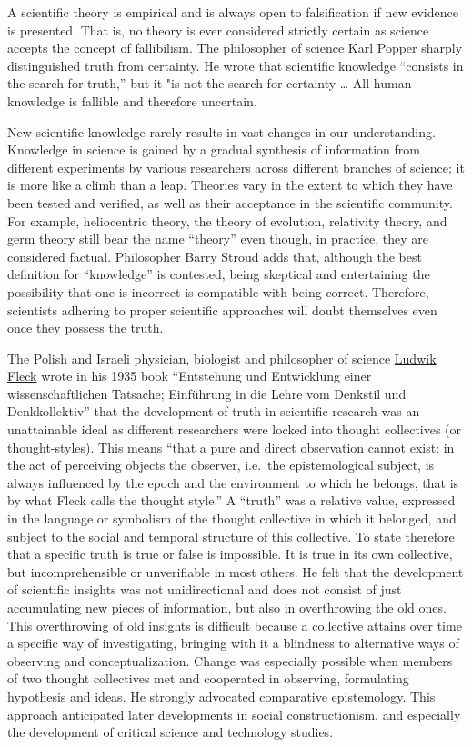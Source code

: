 A scientific theory is empirical and is always open to falsification if new evidence is presented. That is, no theory is ever considered strictly certain as science accepts the concept of fallibilism. The philosopher of science Karl Popper sharply distinguished truth from certainty. He wrote that scientific knowledge ``consists in the search for truth,'' but it "is not the search for certainty \ldots{} All human knowledge is fallible and therefore uncertain.

New scientific knowledge rarely results in vast changes in our understanding. Knowledge in science is gained by a gradual synthesis of information from different experiments by various researchers across different branches of science; it is more like a climb than a leap. Theories vary in the extent to which they have been tested and verified, as well as their acceptance in the scientific community. For example, heliocentric theory, the theory of evolution, relativity theory, and germ theory still bear the name ``theory'' even though, in practice, they are considered factual. Philosopher Barry Stroud adds that, although the best definition for ``knowledge'' is contested, being skeptical and entertaining the possibility that one is incorrect is compatible with being correct. Therefore, scientists adhering to proper scientific approaches will doubt themselves even once they possess the truth.

The Polish and Israeli physician, biologist and philosopher of science \href{https://en.wikipedia.org/wiki/Ludwik_Fleck}{Ludwik Fleck} wrote in his 1935 book ``Entstehung und Entwicklung einer wissenschaftlichen Tatsache; Einführung in die Lehre vom Denkstil und Denkkollektiv'' that the development of truth in scientific research was an unattainable ideal as different researchers were locked into thought collectives (or thought-styles). This means ``that a pure and direct observation cannot exist: in the act of perceiving objects the observer, i.e.~the epistemological subject, is always influenced by the epoch and the environment to which he belongs, that is by what Fleck calls the thought style.'' A ``truth'' was a relative value, expressed in the language or symbolism of the thought collective in which it belonged, and subject to the social and temporal structure of this collective. To state therefore that a specific truth is true or false is impossible. It is true in its own collective, but incomprehensible or unverifiable in most others. He felt that the development of scientific insights was not unidirectional and does not consist of just accumulating new pieces of information, but also in overthrowing the old ones. This overthrowing of old insights is difficult because a collective attains over time a specific way of investigating, bringing with it a blindness to alternative ways of observing and conceptualization. Change was especially possible when members of two thought collectives met and cooperated in observing, formulating hypothesis and ideas. He strongly advocated comparative epistemology. This approach anticipated later developments in social constructionism, and especially the development of critical science and technology studies.


